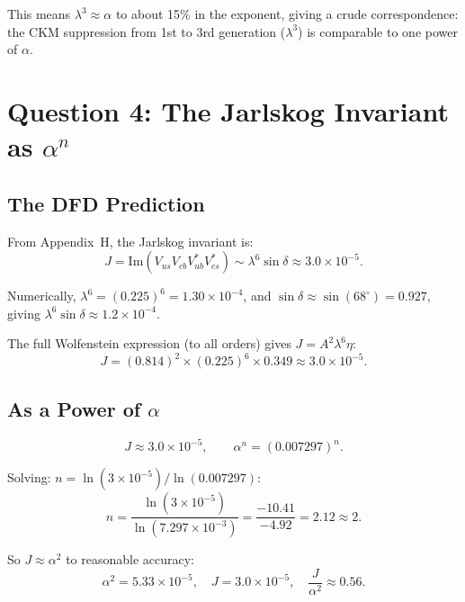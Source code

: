 \documentclass[11pt]{article}
\theoremstyle{remark}
\begin{document}
This means $\lambda^3 \approx \alpha$ to about 15\% in the exponent,
giving a crude correspondence: the CKM suppression from 1st to 3rd
generation ($\lambda^3$) is comparable to one power of $\alpha$.

\section{Question 4: The Jarlskog Invariant as $\alpha^n$}
\label{sec:jarlskog}

\subsection{The DFD Prediction}

From Appendix~H, the Jarlskog invariant is:
\begin{equation}
J = \mathrm{Im}(V_{us}V_{cb}V_{ub}^*V_{cs}^*)
\sim \lambda^6 \sin\delta \approx 3.0 \times 10^{-5}.
\end{equation}

Numerically, $\lambda^6 = (0.225)^6 = 1.30 \times 10^{-4}$,
and $\sin\delta \approx \sin(68^\circ) = 0.927$, giving
$\lambda^6 \sin\delta \approx 1.2 \times 10^{-4}$.

The full Wolfenstein expression (to all orders) gives $J = A^2 \lambda^6 \eta$:
\begin{equation}
J = (0.814)^2 \times (0.225)^6 \times 0.349 \approx 3.0 \times 10^{-5}.
\end{equation}

\subsection{As a Power of $\alpha$}

\begin{equation}
J \approx 3.0 \times 10^{-5}, \qquad
\alpha^n = (0.007297)^n.
\end{equation}

Solving: $n = \ln(3 \times 10^{-5})/\ln(0.007297)$:
\begin{equation}
n = \frac{\ln(3 \times 10^{-5})}{\ln(7.297 \times 10^{-3})}
= \frac{-10.41}{-4.92} = \boxed{2.12 \approx 2}.
\end{equation}

So $J \approx \alpha^2$ to reasonable accuracy:
\begin{equation}
\alpha^2 = 5.33 \times 10^{-5}, \quad J = 3.0 \times 10^{-5}, \quad
\frac{J}{\alpha^2} \approx 0.56.
\end{equation}
\end{document}
